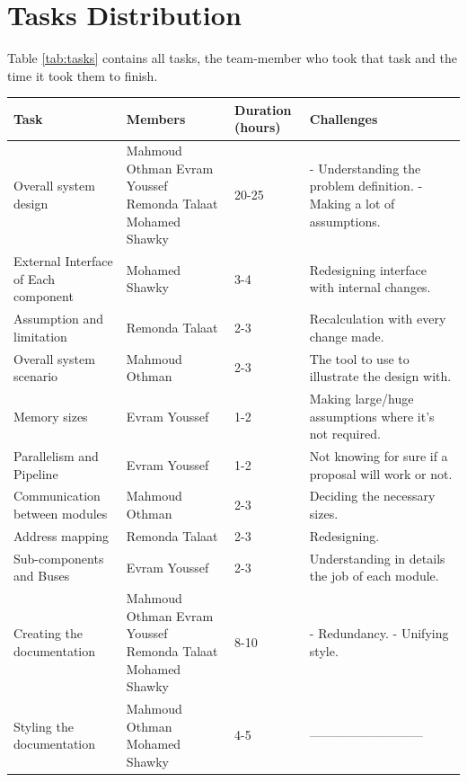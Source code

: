 \documentclass[12pt]{report}
\begin{document}
\section{Tasks Distribution}
Table \ref{tab:tasks} contains all tasks, the team-member who took that task and the time it took them to finish.
\begin{table}
 \begin{tabular}{||p{30mm}| p{40mm}| p{15mm}| p{40mm}||} 
 \hline
 Task & Members & Duration \newline (hours) & Challenges  \\ [0.5ex] 
 \hline\hline
 Overall system design & Mahmoud Othman \newline Evram Youssef \newline Remonda Talaat \newline Mohamed Shawky & 20-25 & - Understanding the problem definition. \newline - Making a lot of assumptions. \\
 \hline
 External Interface of Each component & Mohamed Shawky & 3-4 & Redesigning interface with internal changes. \\ 
 \hline
 Assumption and limitation & Remonda Talaat  & 2-3 & Recalculation with every change made. \\
 \hline
 Overall system scenario & Mahmoud Othman & 2-3 & The tool to use to illustrate the design with. \\
 \hline
 Memory sizes & Evram Youssef & 1-2 & Making large/huge assumptions where it's not required. \\
 \hline
 Parallelism and Pipeline & Evram Youssef & 1-2 & Not knowing for sure if a proposal will work or not. \\
 \hline
 Communication between modules & Mahmoud Othman & 2-3 & Deciding the necessary sizes. \\
 \hline
 Address mapping & Remonda Talaat & 2-3 & Redesigning. \\
 \hline
 Sub-components and Buses & Evram Youssef & 2-3 & Understanding in details the job of each module. \\
 \hline
 Creating the documentation & Mahmoud Othman \newline Evram Youssef \newline Remonda Talaat \newline Mohamed Shawky & 8-10 & - Redundancy. \newline - Unifying style. \\
 \hline
 Styling the documentation & Mahmoud Othman \newline Mohamed Shawky & 4-5 & --------------------------- \\
 \hline\hline
\end{tabular}
\end{table}
\end{document}
